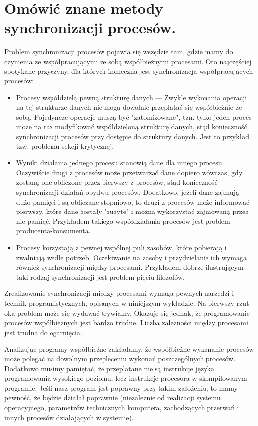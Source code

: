 \section{Omówić znane metody synchronizacji procesów.}

Problem synchronizacji procesów pojawia się wszędzie tam, gdzie mamy do czynienia ze współpracującymi ze sobą współbieżnymi procesami.
Oto najczęściej spotykane przyczyny, dla których konieczna jest synchronizacja współpracujących procesów:

\begin{itemize}[itemsep=0pt,partopsep=0pt, parsep=0pt]
    \item Procesy współdzielą pewną strukturę danych —
    Zwykle wykonania operacji na tej strukturze danych nie mogą dowolnie przeplatać się współbieżnie ze sobą.
    Pojedyncze operacje muszą być "zatomizowane",
    tzn. tylko jeden proces może na raz modyfikować współdzieloną strukturę danych,
    stąd konieczność synchronizacji procesów przy dostępie do struktury danych.
    Jest to przykład tzw. problemu sekcji krytycznej.
    \item Wyniki działania jednego procesu stanowią dane dla innego procesu.
    Oczywiście drugi z procesów może przetwarzać dane dopiero wówczas,
    gdy zostaną one obliczone przez pierwszy z procesów, stąd konieczność synchronizacji działań obydwu procesów.
    Dodatkowo, jeżeli dane zajmują dużo pamięci i są obliczane stopniowo, to drugi z procesów może informować pierwszy,
    które dane zostały "zużyte" i można wykorzystać zajmowaną przez nie pamięć.
    Przykładem takiego współdziałania procesów jest problem producenta-konsumenta.
    \item Procesy korzystają z pewnej wspólnej puli zasobów, które pobierają i zwalniają wedle potrzeb.
    Oczekiwanie na zasoby i przydzielanie ich wymaga również synchronizacji między procesami.
    Przykładem dobrze ilustrującym taki rodzaj synchronizacji jest problem pięciu filozofów.
\end{itemize}

Zrealizowanie synchronizacji między procesami wymaga pewnych narzędzi
i technik programistycznych, opisanych w niniejszym wykładzie.
Na pierwszy rzut oka problem może się wydawać trywialny.
Okazuje się jednak, że programowanie procesów współbieżnych jest bardzo trudne.
Liczba zależności między procesami jest trudna do ogarnięcia.

Analizując programy współbieżne zakładamy, że współbieżne wykonanie procesów może polegać
na dowolnym przepleceniu wykonań poszczególnych procesów.
Dodatkowo musimy pamiętać, że przeplatane nie są instrukcje języka programowania wysokiego poziomu,
lecz instrukcje procesora w skompilowanym programie. Jeśli nasz program jest poprawny przy takim założeniu,
to mamy pewność, że będzie działał poprawnie (niezależnie od realizacji systemu operacyjnego,
parametrów technicznych komputera, zachodzących przerwań i innych procesów działających w systemie).

